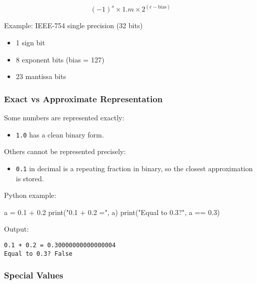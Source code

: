 \documentclass[
  letterpaper,
  DIV=11,
  numbers=noendperiod]{scrreprt}
\newenvironment{Shaded}{\begin{snugshade}}{\end{snugshade}}
\newcommand{\BuiltInTok}[1]{\textcolor[rgb]{0.00,0.23,0.31}{#1}}
\newcommand{\FloatTok}[1]{\textcolor[rgb]{0.68,0.00,0.00}{#1}}
\newcommand{\NormalTok}[1]{\textcolor[rgb]{0.00,0.23,0.31}{#1}}
\newcommand{\OperatorTok}[1]{\textcolor[rgb]{0.37,0.37,0.37}{#1}}
\newcommand{\StringTok}[1]{\textcolor[rgb]{0.13,0.47,0.30}{#1}}
\providecommand{\tightlist}{%
  \setlength{\itemsep}{0pt}\setlength{\parskip}{0pt}}
\begin{document}
\[
(-1)^s \times 1.m \times 2^{(e - \text{bias})}
\]

Example: IEEE-754 single precision (32 bits)

\begin{itemize}
\tightlist
\item
  1 sign bit
\item
  8 exponent bits (bias = 127)
\item
  23 mantissa bits
\end{itemize}

\subsubsection{Exact vs Approximate
Representation}\label{exact-vs-approximate-representation}

Some numbers are represented exactly:

\begin{itemize}
\tightlist
\item
  \texttt{1.0} has a clean binary form.
\end{itemize}

Others cannot be represented precisely:

\begin{itemize}
\tightlist
\item
  \texttt{0.1} in decimal is a repeating fraction in binary, so the
  closest approximation is stored.
\end{itemize}

Python example:

\begin{Shaded}
\begin{Highlighting}[]
\NormalTok{a }\OperatorTok{=} \FloatTok{0.1} \OperatorTok{+} \FloatTok{0.2}
\BuiltInTok{print}\NormalTok{(}\StringTok{"0.1 + 0.2 ="}\NormalTok{, a)}
\BuiltInTok{print}\NormalTok{(}\StringTok{"Equal to 0.3?"}\NormalTok{, a }\OperatorTok{==} \FloatTok{0.3}\NormalTok{)}
\end{Highlighting}
\end{Shaded}

Output:

\begin{verbatim}
0.1 + 0.2 = 0.30000000000000004
Equal to 0.3? False
\end{verbatim}

\subsubsection{Special Values}\label{special-values}
\end{document}
